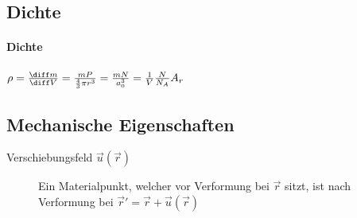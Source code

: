 \begin{sectionbox}
    \subsection{Dichte}
    \paragraph{Dichte} $\rho = \frac{\diff m}{\diff V} = \frac{m P}{\frac{4}{3} \pi r^3} = \frac{m N}{a_0^3} = \frac{1}{V} \frac{N}{N_A} A_r$ \\
\end{sectionbox}


\subsection{Mechanische Eigenschaften}
\begin{description}
    \item[Verschiebungsfeld $\vec u(\vec r)$] Ein Materialpunkt, welcher vor Verformung bei $\vec r$ sitzt, ist nach Verformung bei $\vec r' = \vec r + \vec u(\vec r)$
\end{description}
